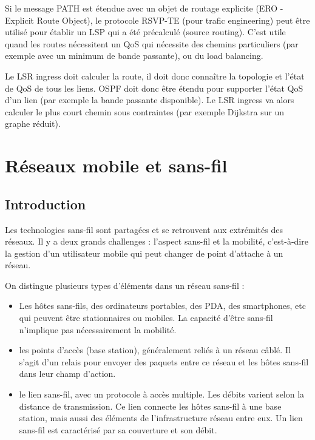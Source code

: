 \documentclass[10pt,a4paper]{report}
\begin{document}
		Si le message PATH est étendue avec un objet de routage explicite (ERO - Explicit Route Object), le protocole RSVP-TE (pour trafic engineering) peut être utilisé pour établir un LSP qui a été précalculé (source routing). C'est utile quand les routes nécessitent un QoS qui nécessite des chemins particuliers (par exemple avec un minimum de bande passante), ou du load balancing.
		
		Le LSR ingress doit calculer la route, il doit donc connaître la topologie et l'état de QoS de tous les liens. OSPF doit donc être étendu pour supporter l'état QoS d'un lien (par exemple la bande passante disponible). Le LSR ingress va alors calculer le plus court chemin sous contraintes (par exemple Dijkstra sur un graphe réduit).
	
\chapter{Réseaux mobile et sans-fil}

	\section{Introduction}
	
	Les technologies sans-fil sont partagées et se retrouvent aux extrémités des réseaux. Il y a deux grands challenges : l'aspect sans-fil et la mobilité, c'est-à-dire la gestion d'un utilisateur mobile qui peut changer de point d'attache à un réseau.
	
	On distingue plusieurs types d'éléments dans un réseau sans-fil :
	
	\begin{itemize}
		\item Les hôtes sans-fils, des ordinateurs portables, des PDA, des smartphones, etc qui peuvent être stationnaires ou mobiles. La capacité d'être sans-fil n'implique pas nécessairement la mobilité.
		
		\item les points d'accès (base station), généralement reliés à un réseau câblé. Il s'agit d'un relais pour envoyer des paquets entre ce réseau et les hôtes sans-fil dans leur champ d'action.
		
		\item le lien sans-fil, avec un protocole à accès multiple. Les débits varient selon la distance de transmission. Ce lien connecte les hôtes sans-fil à une base station, mais aussi des éléments de l'infrastructure réseau entre eux. Un lien sans-fil est caractérisé par sa couverture et son débit.
	\end{itemize}
	
\end{document}
